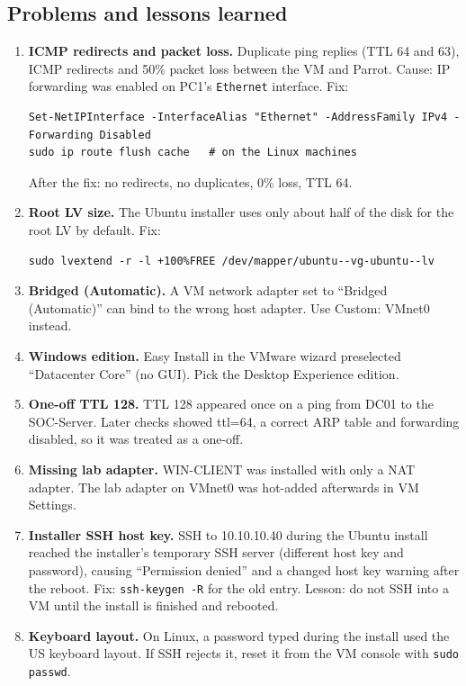 \documentclass[11pt,a4paper]{article}
\begin{document}
\subsection{Problems and lessons learned}
\begin{enumerate}
  \item \textbf{ICMP redirects and packet loss.} Duplicate ping replies
        (TTL 64 and 63), ICMP redirects and 50\% packet loss between the VM
        and Parrot. Cause: IP forwarding was enabled on PC1's
        \texttt{Ethernet} interface. Fix:
\begin{lstlisting}
Set-NetIPInterface -InterfaceAlias "Ethernet" -AddressFamily IPv4 -Forwarding Disabled
sudo ip route flush cache   # on the Linux machines
\end{lstlisting}
        After the fix: no redirects, no duplicates, 0\% loss, TTL 64.
  \item \textbf{Root LV size.} The Ubuntu installer uses only about half of
        the disk for the root LV by default. Fix:
\begin{lstlisting}
sudo lvextend -r -l +100%FREE /dev/mapper/ubuntu--vg-ubuntu--lv
\end{lstlisting}
  \item \textbf{Bridged (Automatic).} A VM network adapter set to
        ``Bridged (Automatic)'' can bind to the wrong host adapter. Use
        Custom: VMnet0 instead.
  \item \textbf{Windows edition.} Easy Install in the VMware wizard
        preselected ``Datacenter Core'' (no GUI). Pick the Desktop Experience
        edition.
  \item \textbf{One-off TTL 128.} TTL 128 appeared once on a ping from DC01
        to the SOC-Server. Later checks showed ttl=64, a correct ARP table and
        forwarding disabled, so it was treated as a one-off.
  \item \textbf{Missing lab adapter.} WIN-CLIENT was installed with only a
        NAT adapter. The lab adapter on VMnet0 was hot-added afterwards in VM
        Settings.
  \item \textbf{Installer SSH host key.} SSH to 10.10.10.40 during the Ubuntu
        install reached the installer's temporary SSH server (different host
        key and password), causing ``Permission denied'' and a changed host key
        warning after the reboot. Fix: \texttt{ssh-keygen -R} for the old
        entry. Lesson: do not SSH into a VM until the install is finished and
        rebooted.
  \item \textbf{Keyboard layout.} On Linux, a password typed during the
        install used the US keyboard layout. If SSH rejects it, reset it from
        the VM console with \texttt{sudo passwd}.
\end{enumerate}
\end{document}

